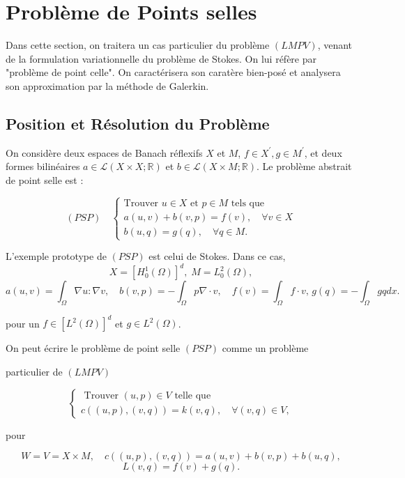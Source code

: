 \section{Problème de Points selles}
Dans cette section, on traitera un cas particulier du problème $(LMPV)$,  venant  de la formulation variationnelle du problème de  Stokes.  On lui  réfère  par "problème de point celle".  On  caractérisera son caratère bien-posé et analysera son  approximation par la méthode de  Galerkin.



\subsection{Position et Résolution du Problème}
On considère deux espaces de Banach réflexifs  $X$ et  $M$, $f \in X^{\prime}, g \in M^{\prime}$, et deux formes  bilinéaires $a \in \mathcal{L}(X \times X ; \mathbb{R})$ et  $b \in \mathcal{L}(X \times M ; \mathbb{R})$.  Le problème abstrait de point selle est :

$$
(PSP)\quad \left\{\begin{array}{l}
	\text {Trouver  } u \in X \text { et  } p \in M \text { tels que  } \\
	a(u, v)+b(v, p)=f(v), \quad \forall v \in X \\
	b(u, q)=g(q), \quad \forall q \in M. 
\end{array}\right.
$$


L'exemple prototype de $(PSP)$ est celui de  Stokes.  Dans ce cas,  $$X=\left[H_{0}^{1}(\Omega)\right]^{d}, \; M=L_{0}^{2}(\Omega),$$
$$
a(u, v)=\int_{\Omega} \nabla u: \nabla v,\quad  b(v, p)=-\int_{\Omega} p \nabla \cdot v, \quad f(v)=\int_{\Omega} f \cdot v, \,   g(q)=-\int_{\Omega} g q dx.
$$

pour un $f\in \left[L^{2}(\Omega)\right]^{d}$ et $g\in L^{2}(\Omega)$. 

On peut écrire le problème de point selle $(PSP)$ comme un problème 

particulier de $(LMPV)$

$$
\left\{\begin{array}{l}
	\text { Trouver  }(u, p) \in V \text { telle que } \\
	c((u, p),(v, q))=k(v, q), \quad \forall(v, q) \in V,
\end{array}\right.
$$

pour 

$$W=V=X \times M, \quad c((u, p),(v, q))=a(u, v)+b(v, p)+b(u, q),
$$
$$L(v, q)=f(v)+g(q).
$$

